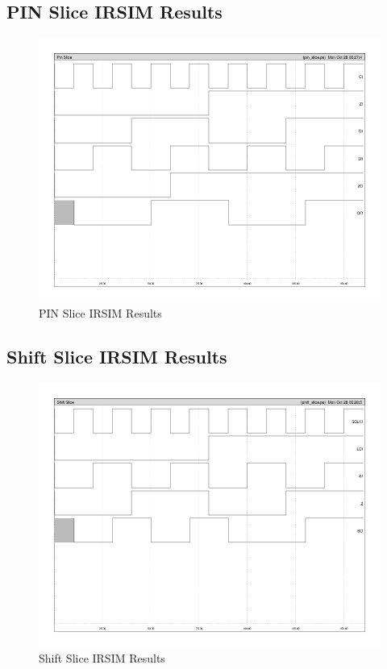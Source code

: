     \subsection{PIN Slice IRSIM Results}
        
        \begin{figure}[H]
            \centering
            \includegraphics[width=0.75\linewidth]{../../irsim/pin_slice.png}
            \caption{PIN Slice IRSIM Results}
        \end{figure}

    \newpage
    \subsection{Shift Slice IRSIM Results}
        
        \begin{figure}[H]
            \centering
            \includegraphics[width=0.75\linewidth]{../../irsim/shift_slice.png}
            \caption{Shift Slice IRSIM Results}
        \end{figure}

